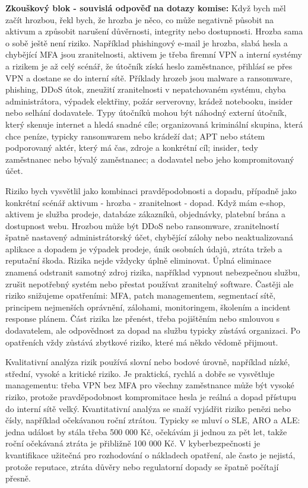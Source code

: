 \documentclass[11pt,a4paper]{article}
\begin{document}
\begin{beigebox}
\textbf{Zkouškový blok - souvislá odpověď na dotazy komise:}
Když bych měl začít hrozbou, řekl bych, že hrozba je něco, co může negativně působit na aktivum a způsobit narušení důvěrnosti, integrity nebo dostupnosti. Hrozba sama o sobě ještě není riziko. Například phishingový e-mail je hrozba, slabá hesla a chybějící MFA jsou zranitelnosti, aktivem je třeba firemní VPN a interní systémy a rizikem je až celý scénář, že útočník získá heslo zaměstnance, přihlásí se přes VPN a dostane se do interní sítě. Příklady hrozeb jsou malware a ransomware, phishing, DDoS útok, zneužití zranitelnosti v nepatchovaném systému, chyba administrátora, výpadek elektřiny, požár serverovny, krádež notebooku, insider nebo selhání dodavatele. Typy útočníků mohou být náhodný externí útočník, který skenuje internet a hledá snadné cíle; organizovaná kriminální skupina, která chce peníze, typicky ransomwarem nebo krádeží dat; APT nebo státem podporovaný aktér, který má čas, zdroje a konkrétní cíl; insider, tedy zaměstnanec nebo bývalý zaměstnanec; a dodavatel nebo jeho kompromitovaný účet.

Riziko bych vysvětlil jako kombinaci pravděpodobnosti a dopadu, případně jako konkrétní scénář aktivum - hrozba - zranitelnost - dopad. Když mám e-shop, aktivem je služba prodeje, databáze zákazníků, objednávky, platební brána a dostupnost webu. Hrozbou může být DDoS nebo ransomware, zranitelností špatně nastavený administrátorský účet, chybějící zálohy nebo neaktualizovaná aplikace a dopadem je výpadek prodeje, únik osobních údajů, ztráta tržeb a reputační škoda. Rizika nejde vždycky úplně eliminovat. Úplná eliminace znamená odstranit samotný zdroj rizika, například vypnout nebezpečnou službu, zrušit nepotřebný systém nebo přestat používat zranitelný software. Častěji ale riziko snižujeme opatřeními: MFA, patch managementem, segmentací sítě, principem nejmenších oprávnění, zálohami, monitoringem, školením a incident response plánem. Část rizika lze přenést, třeba pojištěním nebo smlouvou s dodavatelem, ale odpovědnost za dopad na službu typicky zůstává organizaci. Po opatřeních vždy zůstává zbytkové riziko, které má někdo vědomě přijmout.

Kvalitativní analýza rizik používá slovní nebo bodové úrovně, například nízké, střední, vysoké a kritické riziko. Je praktická, rychlá a dobře se vysvětluje managementu: třeba VPN bez MFA pro všechny zaměstnance může být vysoké riziko, protože pravděpodobnost kompromitace hesla je reálná a dopad přístupu do interní sítě velký. Kvantitativní analýza se snaží vyjádřit riziko penězi nebo čísly, například očekávanou roční ztrátou. Typicky se mluví o SLE, ARO a ALE: jedna událost by stála třeba 500 000 Kč, očekávám ji jednou za pět let, takže roční očekávaná ztráta je přibližně 100 000 Kč. V kyberbezpečnosti je kvantifikace užitečná pro rozhodování o nákladech opatření, ale často je nejistá, protože reputace, ztráta důvěry nebo regulatorní dopady se špatně počítají přesně.


\end{beigebox}
\end{document}
